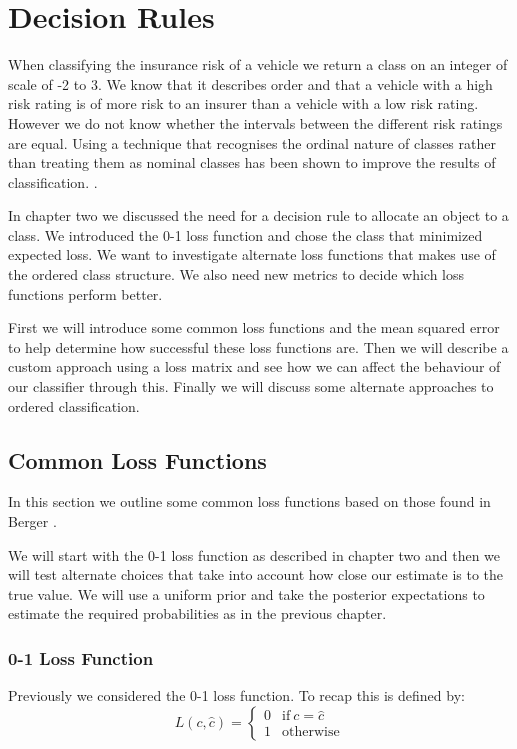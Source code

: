 \chapter{Decision Rules}

When classifying the insurance risk of a vehicle we return a class on an integer of scale of -2 to 3.
We know that it describes order and that a vehicle with a high risk rating is of more risk to an insurer than a vehicle with a low risk rating.
However we do not know whether the intervals between the different risk ratings are equal.
Using a technique that recognises the ordinal nature of classes rather than treating them as nominal classes has been shown to improve the results of classification. \cite{Agresti10}.

In chapter two we discussed the need for a decision rule to allocate an object to a class.
We introduced the 0-1 loss function and chose the class that minimized expected loss.
We want to investigate alternate loss functions that makes use of the ordered class structure.
We also need new metrics to decide which loss functions perform better.

First we will introduce some common loss functions and the mean squared error to help determine how successful these loss functions are.
Then we will describe a custom approach using a loss matrix and see how we can affect the behaviour of our classifier through this.
Finally we will discuss some alternate approaches to ordered classification.

\section{Common Loss Functions}

In this section we outline some common loss functions based on those found in Berger \cite{Berger85}.

We will start with the 0-1 loss function as described in chapter two and then we will test alternate choices that take into account how close our estimate is to the true value.
We will use a uniform prior and take the posterior expectations to estimate the required probabilities as in the previous chapter.

\subsection{0-1 Loss Function}
Previously we considered the 0-1 loss function.
To recap this is defined by:
\begin{equation}
	L(c, \hat{c}) = 
	\begin{cases}
		0 & \text{if}\ c = \hat{c} \\
		1 & \text{otherwise}
	\end{cases}
\end{equation}


